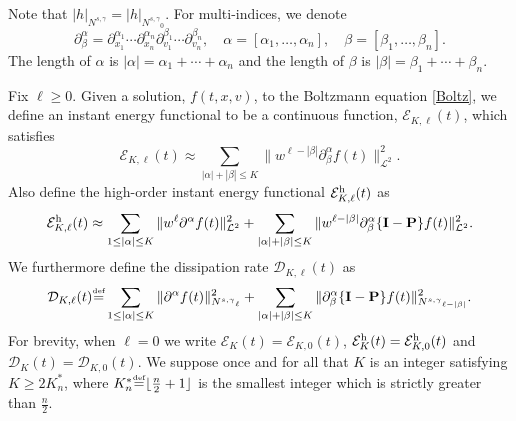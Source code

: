 \documentclass{amsart}
\numberwithin{equation}{section}
\begin{document}
Note that  
$
{|} h {|}_{N^{s,\gamma}}
=
{|} h {|}_{{{N^{s,\gamma}}_0}}.
$
For
multi-indices, we denote
\begin{equation*}
 {\partial}^{\alpha}_{\beta}={\partial}_{x_1}^{{\alpha}_1}\cdots{\partial}_{x_{n}}^{{\alpha}_{n}}
    {\partial}_{{v}_1}^{{\beta}_1}\cdots{\partial}_{{v}_{n}}^{{\beta}_{n}},
    \quad
    {\alpha}=[{\alpha}_1,\ldots,{\alpha}_{n}],
    \quad
{\beta}=[{\beta}_1,\ldots,{\beta}_{n}].
\end{equation*}
The length of ${\alpha}$ is $|{\alpha}|={\alpha}_1+\cdots+{\alpha}_{n}$ and the length of
${\beta}$ is $|{\beta}|={\beta}_1+\cdots+{\beta}_{n}$. 

Fix ${\ell}\ge 0$.
Given a solution, ${f}(t,x,{v})$, to the Boltzmann equation \eqref{Boltz}, we define an instant energy functional to be a continuous function, 
 ${\mathcal{E}}_{{K},{\ell}}(t)$, which satisfies
\begin{equation}
{\mathcal{E}}_{{K},{\ell}}(t)\approx
\sum_{|{\alpha}|+|{\beta}|\leq {K}}\|w^{{\ell}-|{\beta}|}{\partial}^{\alpha}_{\beta} {f}(t)\|_{{\mathcal{L}}^2}^2.
\label{def.eNm}
\end{equation}
Also define the high-order instant energy functional ${\mathcal{E}}_{{K},{\ell}}^{\rm h}(t)$ as
\begin{equation}
{\mathcal{E}}_{{K},{\ell}}^{\rm h}(t)\approx
 \sum_{1\leq |{\alpha}|\leq {K}}\|w^{\ell}{\partial}^{\alpha} {f}(t)\|_{{\mathcal{L}}^2}^2+\sum_{|{\alpha}|+|{\beta}|\leq {K}}\|w^{{\ell}-|{\beta}|}{\partial}^{\alpha}_{\beta}  \{{\mathbf{I}}-{\mathbf{P}}\}{f}(t)\|^2_{{\mathcal{L}}^2}.
 \label{def.eNm.h}
\end{equation}
We furthermore define the dissipation rate ${\mathcal{D}}_{{K},{\ell}}(t)$ as
\begin{equation}
{\mathcal{D}}_{{K},{\ell}}(t)
{\overset{\mbox{\tiny{def}}}{=}}
\sum_{1\leq |{\alpha}|\leq {K}}\|{\partial}^{\alpha} {f}(t)\|_{{N^{s,\gamma}}_{\ell}}^2+\sum_{|{\alpha}|+|{\beta}|\leq {K}}\|{\partial}^{\alpha}_{\beta} \{{\mathbf{I}}-{\mathbf{P}}\}{f}(t)\|_{{N^{s,\gamma}}_{{\ell}-|{\beta}|}}^2.
\label{def.dNm}
\end{equation}
For brevity, when ${\ell}=0$ we write ${\mathcal{E}}_{K}(t)={\mathcal{E}}_{{K},0}(t)$, ${\mathcal{E}}_{K}^{\rm h}(t)={\mathcal{E}}_{{K},0}^{\rm h}(t)$ and ${\mathcal{D}}_{K}(t)={\mathcal{D}}_{{K},0}(t)$.  We suppose once and for all that ${K}$ is an integer satisfying ${{K \ge 2{K^*_n}}}$, where ${K^*_n} {\overset{\mbox{\tiny{def}}}{=}} \lfloor \frac{n}{2} +1 \rfloor$ is the smallest integer which is strictly greater than $\frac{n}{2}$. 
\end{document}
